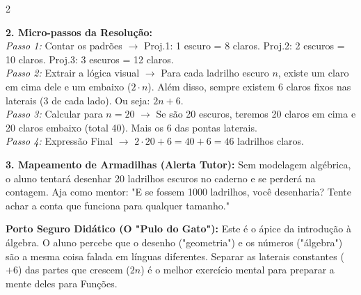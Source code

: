\begin{multicols*}{2}
\begin{tcolorbox}[colback=CorTitUm!5, colframe=CorTitUm, boxrule=1pt, arc=4pt, left=6pt, right=6pt, top=6pt, bottom=6pt]
    \textbf{2. Micro-passos da Resolução:}\\
    \textit{Passo 1:} Contar os padrões $\rightarrow$ Proj.1: 1 escuro = 8 claros. Proj.2: 2 escuros = 10 claros. Proj.3: 3 escuros = 12 claros.\\
    \textit{Passo 2:} Extrair a lógica visual $\rightarrow$ Para cada ladrilho escuro $n$, existe um claro em cima dele e um embaixo ($2 \cdot n$). Além disso, sempre existem 6 claros fixos nas laterais (3 de cada lado). Ou seja: $ 2n + 6 $.\\
    \textit{Passo 3:} Calcular para $n = 20$ $\rightarrow$ Se são 20 escuros, teremos 20 claros em cima e 20 claros embaixo (total 40). Mais os 6 das pontas laterais.\\
    \textit{Passo 4:} Expressão Final $\rightarrow$ $ 2 \cdot 20 + 6 = 40 + 6 = 46 $ ladrilhos claros.\par\vspace{0.1cm}
    
    \textbf{3. Mapeamento de Armadilhas (Alerta Tutor):} Sem modelagem algébrica, o aluno tentará desenhar 20 ladrilhos escuros no caderno e se perderá na contagem. Aja como mentor: "E se fossem 1000 ladrilhos, você desenharia? Tente achar a conta que funciona para qualquer tamanho."
    \end{tcolorbox}
    \vspace{0.15cm}
    
    \begin{boxexplicacao}
    \textbf{Porto Seguro Didático (O "Pulo do Gato"):} Este é o ápice da introdução à álgebra. O aluno percebe que o desenho ("geometria") e os números ("álgebra") são a mesma coisa falada em línguas diferentes. Separar as laterais constantes ($+6$) das partes que crescem ($2n$) é o melhor exercício mental para preparar a mente deles para Funções.
    \end{boxexplicacao}
\fi

\par\vspace{\espacoQuestao}

\end{multicols*}
